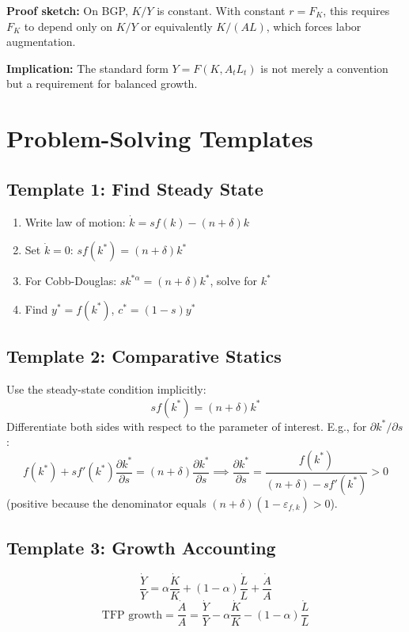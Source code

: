\documentclass[a4paper,11pt]{article}
\begin{document}
\textbf{Proof sketch:} On BGP, $K/Y$ is constant. With constant $r = F_K$, this requires $F_K$ to depend only on $K/Y$ or equivalently $K/(AL)$, which forces labor augmentation.

\textbf{Implication:} The standard form $Y = F(K, A_t L_t)$ is not merely a convention but a requirement for balanced growth.

\section{Problem-Solving Templates}

\subsection*{Template 1: Find Steady State}

\begin{enumerate}
    \item Write law of motion: $\dot{k} = sf(k) - (n+\delta)k$
    \item Set $\dot{k}=0$: $sf(k^*) = (n+\delta)k^*$
    \item For Cobb-Douglas: $sk^{*\alpha} = (n+\delta)k^*$, solve for $k^*$
    \item Find $y^* = f(k^*)$, $c^* = (1-s)y^*$
\end{enumerate}

\subsection*{Template 2: Comparative Statics}

Use the steady-state condition implicitly:
\[
s f(k^*) = (n+\delta) k^*
\]
Differentiate both sides with respect to the parameter of interest. E.g., for $\partial k^*/\partial s$:
\[
f(k^*) + s f'(k^*)\frac{\partial k^*}{\partial s} = (n+\delta)\frac{\partial k^*}{\partial s}
\implies
\frac{\partial k^*}{\partial s} = \frac{f(k^*)}{(n+\delta) - sf'(k^*)} > 0
\]
(positive because the denominator equals $(n+\delta)(1-\varepsilon_{f,k}) > 0$).

\subsection*{Template 3: Growth Accounting}

\[
\frac{\dot{Y}}{Y} = \alpha \frac{\dot{K}}{K} + (1-\alpha)\frac{\dot{L}}{L} + \frac{\dot{A}}{A}
\]
\[
\text{TFP growth} = \frac{\dot{A}}{A} = \frac{\dot{Y}}{Y} - \alpha \frac{\dot{K}}{K} - (1-\alpha)\frac{\dot{L}}{L}
\]
\end{document}
